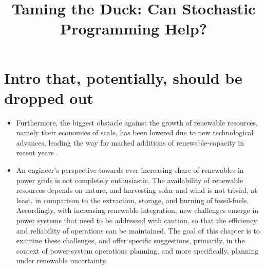 

\usepackage{natbib}			%
\setlength{\bibsep}{0pt}

\setlength{\textheight}{23cm} %
\setlength{\topmargin}{-2cm}
\setlength{\textwidth}{17.5cm} \setlength{\oddsidemargin}{-0.5cm}
\setlength{\evensidemargin}{-0.5cm}

\setlength{\parindent}{0pt}

\newcommand{\gap}{\vspace{5pt}}
\newcommand{\epc}{\hspace{1pc}}

\newcommand{\onebld}{{\bf 1}}
\newcommand{\wt}{\widetilde}
\newcommand{\wh}{\widehat}

\usepackage{moreverb} %
\immediate{}
\newcommand\wordcount{
}

\immediate{}
\newcommand\charcount{
}

\newcommand{\E}{{\rm I\!E}}
\newcommand{\IP}{{\rm I\!P}}
\newcommand{\D}{{\rm I\!D}}
\newcommand{\pmat}[1]{\begin{pmatrix} #1 \end{pmatrix}}
\newcommand{\us}[1]{{\color{black}#1}}
\newcommand{\ssbs}[1]{{\color{blue}#1}}


\title{\bf Taming the Duck: Can Stochastic Programming Help?}


\maketitle

\section{Intro that, potentially, should be dropped out}

\begin{itemize}
\item Furthermore, the biggest obstacle against the growth of renewable resources, namely their economies of scale, has been lowered due to new technological advances, leading the way for marked additions of renewable-capacity in recent years \citep{Guardian2017}. 
\item An engineer's perspective towards ever increasing share of renewables in power grids is not completely enthusiastic. The availability of renewable resources depends on nature, and harvesting solar and wind is not trivial, at least, in comparison to the extraction, storage, and burning of fossil-fuels. Accordingly, with increasing renewable integration, new challenges emerge in power systems that need to be addressed with caution, so that the efficiency and reliability of operations can be maintained. The goal of this chapter is to examine these challenges, and offer specific suggestions, primarily, in the context of power-system operations planning, and more specifically, planning under renewable uncertainty.
\end{itemize}

